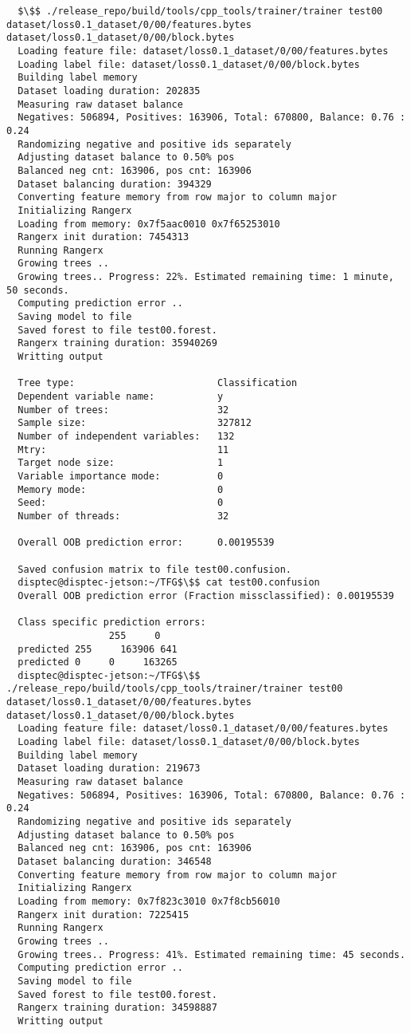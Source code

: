 \documentclass[12pt,oneside]{book}
\begin{document}
\begin{lstlisting}
  $\$$ ./release_repo/build/tools/cpp_tools/trainer/trainer test00 dataset/loss0.1_dataset/0/00/features.bytes dataset/loss0.1_dataset/0/00/block.bytes 
  Loading feature file: dataset/loss0.1_dataset/0/00/features.bytes
  Loading label file: dataset/loss0.1_dataset/0/00/block.bytes
  Building label memory
  Dataset loading duration: 202835
  Measuring raw dataset balance
  Negatives: 506894, Positives: 163906, Total: 670800, Balance: 0.76 : 0.24
  Randomizing negative and positive ids separately
  Adjusting dataset balance to 0.50% pos
  Balanced neg cnt: 163906, pos cnt: 163906
  Dataset balancing duration: 394329
  Converting feature memory from row major to column major
  Initializing Rangerx
  Loading from memory: 0x7f5aac0010 0x7f65253010
  Rangerx init duration: 7454313
  Running Rangerx
  Growing trees ..
  Growing trees.. Progress: 22%. Estimated remaining time: 1 minute, 50 seconds.
  Computing prediction error ..
  Saving model to file
  Saved forest to file test00.forest.
  Rangerx training duration: 35940269
  Writting output
  
  Tree type:                         Classification
  Dependent variable name:           y
  Number of trees:                   32
  Sample size:                       327812
  Number of independent variables:   132
  Mtry:                              11
  Target node size:                  1
  Variable importance mode:          0
  Memory mode:                       0
  Seed:                              0
  Number of threads:                 32
  
  Overall OOB prediction error:      0.00195539
  
  Saved confusion matrix to file test00.confusion.
  disptec@disptec-jetson:~/TFG$\$$ cat test00.confusion 
  Overall OOB prediction error (Fraction missclassified): 0.00195539
  
  Class specific prediction errors:
                  255     0
  predicted 255     163906 641   
  predicted 0     0     163265 
  disptec@disptec-jetson:~/TFG$\$$ ./release_repo/build/tools/cpp_tools/trainer/trainer test00 dataset/loss0.1_dataset/0/00/features.bytes dataset/loss0.1_dataset/0/00/block.bytes 
  Loading feature file: dataset/loss0.1_dataset/0/00/features.bytes
  Loading label file: dataset/loss0.1_dataset/0/00/block.bytes
  Building label memory
  Dataset loading duration: 219673
  Measuring raw dataset balance
  Negatives: 506894, Positives: 163906, Total: 670800, Balance: 0.76 : 0.24
  Randomizing negative and positive ids separately
  Adjusting dataset balance to 0.50% pos
  Balanced neg cnt: 163906, pos cnt: 163906
  Dataset balancing duration: 346548
  Converting feature memory from row major to column major
  Initializing Rangerx
  Loading from memory: 0x7f823c3010 0x7f8cb56010
  Rangerx init duration: 7225415
  Running Rangerx
  Growing trees ..
  Growing trees.. Progress: 41%. Estimated remaining time: 45 seconds.
  Computing prediction error ..
  Saving model to file
  Saved forest to file test00.forest.
  Rangerx training duration: 34598887
  Writting output
  

\end{lstlisting}
\end{document}
